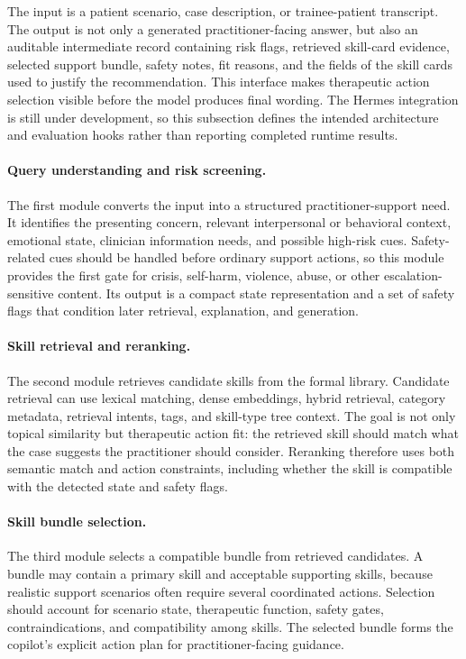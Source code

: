\documentclass[11pt]{article}
\begin{document}
The input is a patient scenario, case description, or trainee-patient transcript. The output is not only a generated practitioner-facing answer, but also an auditable intermediate record containing risk flags, retrieved skill-card evidence, selected support bundle, safety notes, fit reasons, and the fields of the skill cards used to justify the recommendation. This interface makes therapeutic action selection visible before the model produces final wording. The Hermes integration is still under development, so this subsection defines the intended architecture and evaluation hooks rather than reporting completed runtime results.

\paragraph{Query understanding and risk screening.}
The first module converts the input into a structured practitioner-support need. It identifies the presenting concern, relevant interpersonal or behavioral context, emotional state, clinician information needs, and possible high-risk cues. Safety-related cues should be handled before ordinary support actions, so this module provides the first gate for crisis, self-harm, violence, abuse, or other escalation-sensitive content. Its output is a compact state representation and a set of safety flags that condition later retrieval, explanation, and generation.

\paragraph{Skill retrieval and reranking.}
The second module retrieves candidate skills from the formal library. Candidate retrieval can use lexical matching, dense embeddings, hybrid retrieval, category metadata, retrieval intents, tags, and skill-type tree context. The goal is not only topical similarity but therapeutic action fit: the retrieved skill should match what the case suggests the practitioner should consider. Reranking therefore uses both semantic match and action constraints, including whether the skill is compatible with the detected state and safety flags.

\paragraph{Skill bundle selection.}
The third module selects a compatible bundle from retrieved candidates. A bundle may contain a primary skill and acceptable supporting skills, because realistic support scenarios often require several coordinated actions. Selection should account for scenario state, therapeutic function, safety gates, contraindications, and compatibility among skills. The selected bundle forms the copilot's explicit action plan for practitioner-facing guidance.
\end{document}

